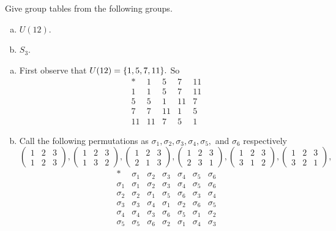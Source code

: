 \begin{problem}
	Give group tables from the following groups.
	\begin{enumerate}[(a)]
		\item $ U(12) $.
		\item $ S_3 $.
	\end{enumerate}
\end{problem}
\begin{solution}
	\begin{enumerate}[(a)]
		\item First observe that $ U(12) = \{1,5,7,11\}. $
		So 
		\[ \begin{array}{c|cccc}
			 * & 1 & 5 & 7 & 11 \\
			 \hline
			 1 & 1 & 5 & 7 & 11 \\
			 5 & 5 & 1 & 11 & 7 \\ 
			 7 & 7 & 11 & 1 & 5 \\
			 11 & 11 & 7 & 5 & 1
		\end{array} \]
		\item Call the following permutations as $ \sigma_1,\sigma_2,\sigma_3,\sigma_4,\sigma_5, $ and $ \sigma_6 $ respectively
		\[ \begin{pmatrix} 1&2&3\\1&2&3 \end{pmatrix}, \begin{pmatrix} 1&2&3\\1&3&2 \end{pmatrix}, \begin{pmatrix} 1&2&3\\2&1&3 \end{pmatrix},\begin{pmatrix} 1&2&3\\2&3&1  \end{pmatrix},\begin{pmatrix} 1&2&3\\3&1&2 \end{pmatrix},\begin{pmatrix} 1&2&3\\3&2&1 \end{pmatrix}, \]
		\[ 
		\begin{array}{c|cccccc}
			*        & \sigma_1 & \sigma_2 & \sigma_3 & \sigma_4 & \sigma_5 & \sigma_6 \\
			\hline 
			\sigma_1 & \sigma_1 & \sigma_2 & \sigma_3 & \sigma_4 & \sigma_5 & \sigma_6 \\ 
			\sigma_2 & \sigma_2 & \sigma_1 & \sigma_5 & \sigma_6 & \sigma_3 & \sigma_4 \\ \sigma_3 & \sigma_3 & \sigma_4 & \sigma_1 & \sigma_2 & \sigma_6 & \sigma_5 \\ 
			\sigma_4 & \sigma_4 & \sigma_3 & \sigma_6 & \sigma_5 & \sigma_1 & \sigma_2 \\
			\sigma_5 & \sigma_5 & \sigma_6 & \sigma_2 & \sigma_1 & \sigma_4 & \sigma_3 
		\end{array}
		 \]
	\end{enumerate}
\end{solution}




